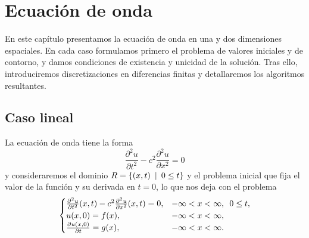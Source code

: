 \chapter{Ecuación de onda}
\label{cap:wave}
\begin{resumen}
		En este capítulo presentamos la ecuación de onda en una y dos dimensiones espaciales.
	En cada caso formulamos primero el problema de valores iniciales y de contorno, y damos condiciones de existencia y unicidad de la solución. Tras ello, introduciremos discretizaciones en diferencias finitas y detallaremos los algoritmos resultantes.
\end{resumen}

\section{Caso lineal}
La ecuación de onda tiene la forma
\begin{equation}
	\frac{\partial^2u}{\partial t^2} - c^2\frac{\partial^2u}{\partial x^2} = 0
\end{equation}
y consideraremos el dominio $R=\{(x,t) \hspace{5px} | \hspace{5px} 0\leq t\}$ y el problema inicial que fija el valor de la función y su derivada en $t=0$, lo que nos deja con el problema 
\begin{equation}
	\label{eq:1dwave}
\begin{cases}
	\frac{\partial^2u}{\partial t^2}(x,t) - c^2\frac{\partial^2u}{\partial x^2}(x,t) = 0, & -\infty < x < \infty, \hspace{5px} 0\leq t,\\
	u(x,0) = f(x), & -\infty < x < \infty, \\
	\frac{\partial u(x,0)}{\partial t} = g(x), & -\infty < x < \infty.
\end{cases}
\end{equation}
